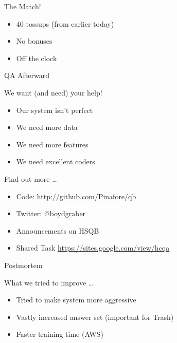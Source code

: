 \documentclass[compress]{beamer}
\begin{document}
\begin{frame}{}

	\begin{center}
	\begin{Huge}
	The Match! \\
	\end{Huge}
        \begin{itemize}
          \item 40 tossups (from earlier today)
          \item No bonuses
          \item Off the clock
        \end{itemize}

        \pause
        QA Afterward
	\end{center}

\end{frame}


\begin{frame}{We want (and need) your help!}

	\begin{itemize}
		\item Our system isn't perfect
		\item We need more data
		\item We need more features
		\item We need excellent coders
	\end{itemize}

	\pause

	\begin{block}{Find out more \dots}
		\begin{itemize}
			\item Code: \url{http://github.com/Pinafore/qb}
			\item Twitter: @boydgraber
			\item Announcements on HSQB
                        \item Shared Task \url{https://sites.google.com/view/hcqa}
		\end{itemize}
	\end{block}

\end{frame}

\begin{frame}{Postmortem}

What we tried to improve \dots
\begin{itemize}
	\item Tried to make system more aggressive
        \item Vastly increased answer set (important for Trash)
        \item Faster training time (AWS)
\end{itemize}
\end{frame}
\end{document}

